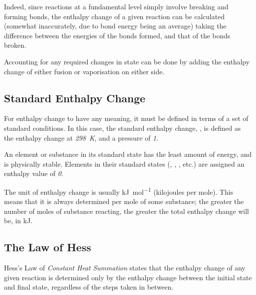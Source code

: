 
		Indeed, since reactions at a fundamental level simply involve breaking and forming bonds, the enthalpy change of a given reaction
		can be calculated (somewhat inaccurately, due to bond energy being an average) taking the difference between the energies of the
		bonds formed, and that of the bonds broken.


		Accounting for any required changes in state can be done by adding the enthalpy change of either fusion or vaporisation on either
		side.







	\pagebreak
	\subsection{Standard Enthalpy Change}

		For enthalpy change to have any meaning, it must be defined in terms of a set of standard conditions. In this case, the standard
		enthalpy change, \enthStd{}, is defined as the enthalpy change at \textit{\SI{298}{\kelvin}}, and a pressure of \textit{\SI{1}{\atm}}.

		An element or substance in its standard state has the least amount of energy, and is physically stable. Elements in their standard
		states (, , , etc.) are assigned an enthalpy value of \textit{0}.

		The unit of enthalpy change is usually \si{\kilo\joule\per\mole} (kilojoules per mole). This means that it is always determined
		per mole of some substance; the greater the number of moles of substance reacting, the greater the total enthalpy change will be,
		in \si{\kilo\joule}.


	\pagebreak
	\subsection{The Law of Hess}

		Hess's Law of \textit{Constant Heat Summation} states that the enthalpy change of any given reaction is determined only by the
		enthalpy change between the initial state and final state, regardless of the steps taken in between.

